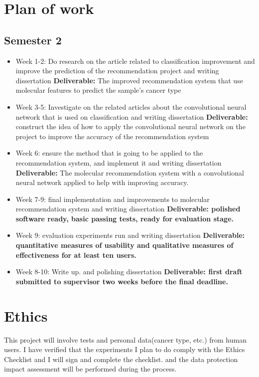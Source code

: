 \documentclass[11pt]{article}
\begin{document}
\section{Plan of work}\label{plan-of-work}

\subsection{Semester 2}

\begin{itemize}

    \item
	Week 1-2: Do research on the article related to classification improvement and improve the prediction of the recommendation project and writing dissertation \textbf{Deliverable:}
	The improved recommendation system that use molecular features to predict the sample's cancer type
	\item
	Week 3-5: Investigate on the related articles about the convolutional neural network that is used on classification and writing dissertation \textbf{Deliverable:}
	construct the idea of how to apply the convolutional neural network on the project to improve the accuracy of the recommendation system
	\item
	Week 6: ensure the method that is going to be applied to the recommendation system, and implement it and writing dissertation
	\textbf{Deliverable:} The molecular recommendation system with a convolutional neural network applied to help with improving accuracy.
	\item
	Week 7-9: final implementation and improvements to molecular recommendation system and writing dissertation
	\textbf{Deliverable: polished software ready, basic passing tests,
	ready for evaluation stage.}
	\item
	Week 9: evaluation experiments run and writing dissertation \textbf{Deliverable: quantitative
	measures of usability and qualitative measures of effectiveness for at
	least ten users.}
	\item
	Week 8-10: Write up. and polishing dissertation \textbf{Deliverable: first draft submitted to
	supervisor two weeks before the final deadline.}
    \end{itemize}


\section{Ethics}

This project will involve tests and personal data(cancer type, etc.) from human users. I have verified that the experiments I plan to do comply with the Ethics Checklist and I will sign and complete the checklist. and the data protection impact assessment will be performed during the process.
\end{document}
